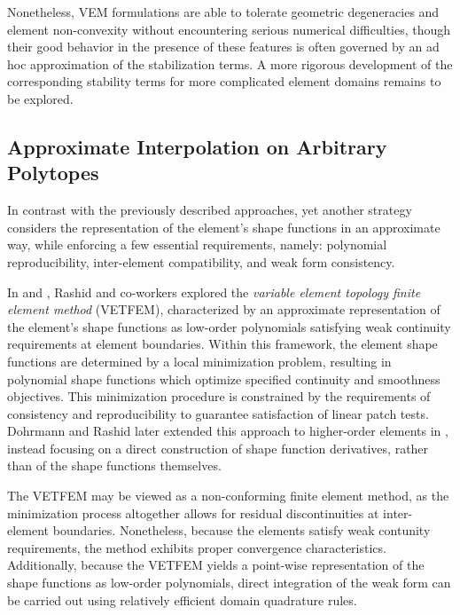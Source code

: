 		Nonetheless, VEM formulations are able to tolerate geometric degeneracies and element non-convexity without encountering serious numerical difficulties, though their good behavior in the presence of these features is often governed by an ad hoc approximation of the stabilization terms. A more rigorous development of the corresponding stability terms for more complicated element domains remains to be explored.
		
	\subsection*{Approximate Interpolation on Arbitrary Polytopes}
		In contrast with the previously described approaches, yet another strategy considers the representation of the element's shape functions in an approximate way, while enforcing a few essential requirements, namely: polynomial reproducibility, inter-element compatibility, and weak form consistency.
		
		In \cite{Rashid:00} and \cite{Rashid:06}, Rashid and co-workers  explored the \textit{variable element topology finite element method} (VETFEM), characterized by an approximate representation of the element's shape functions as low-order polynomials satisfying weak continuity requirements at element boundaries. Within this framework, the element shape functions are determined by a local minimization problem, resulting in polynomial shape functions which optimize specified continuity and smoothness objectives. This minimization procedure is constrained by the requirements of consistency and reproducibility to guarantee satisfaction of linear patch tests. Dohrmann and Rashid later extended this approach to higher-order elements in \cite{Dohrmann:02}, instead focusing on a direct construction of shape function derivatives, rather than of the shape functions themselves.
		
		The VETFEM may be viewed as a non-conforming finite element method, as the minimization process altogether allows for residual discontinuities at inter-element boundaries. Nonetheless, because the elements satisfy weak contunity requirements, the method exhibits proper convergence characteristics. Additionally, because the VETFEM yields a point-wise representation of the shape functions as low-order polynomials, direct integration of the weak form can be carried out using relatively efficient domain quadrature rules.
			
